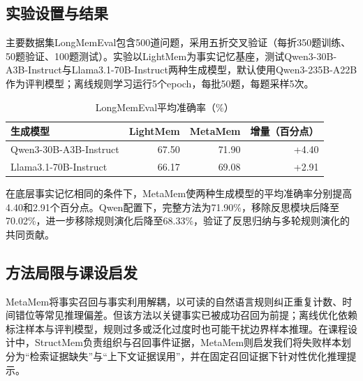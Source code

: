 \subsection{实验设置与结果}

主要数据集LongMemEval包含500道问题，采用五折交叉验证（每折350题训练、50题验证、100题测试）。实验以LightMem为事实记忆基座，测试Qwen3-30B-A3B-Instruct与Llama3.1-70B-Instruct两种生成模型，默认使用Qwen3-235B-A22B作为评判模型；离线规则学习运行5个epoch，每批50题，每题采样5次。

\begin{table}[!htbp]
\centering\small
\caption{LongMemEval平均准确率（\%）}
\begin{tabular}{lrrr}
\toprule
生成模型 & LightMem & MetaMem & 增量（百分点）\\
\midrule
Qwen3-30B-A3B-Instruct & 67.50 & 71.90 & +4.40\\
Llama3.1-70B-Instruct & 66.17 & 69.08 & +2.91\\
\bottomrule
\end{tabular}
\end{table}

在底层事实记忆相同的条件下，MetaMem使两种生成模型的平均准确率分别提高4.40和2.91个百分点。Qwen配置下，完整方法为71.90\%，移除反思模块后降至70.02\%，进一步移除规则演化后降至68.33\%，验证了反思归纳与多轮规则演化的共同贡献。

\subsection{方法局限与课设启发}

MetaMem将事实召回与事实利用解耦，以可读的自然语言规则纠正重复计数、时间错位等常见推理偏差。但该方法以关键事实已被成功召回为前提；离线优化依赖标注样本与评判模型，规则过多或泛化过度时也可能干扰边界样本推理。在课程设计中，StructMem负责组织与召回事件证据，MetaMem则启发我们将失败样本划分为“检索证据缺失”与“上下文证据误用”，并在固定召回证据下针对性优化推理提示。

